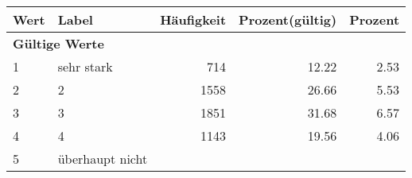      \begin{longtable}{lXrrr}
     \toprule
     \textbf{Wert} & \textbf{Label} & \textbf{Häufigkeit} & \textbf{Prozent(gültig)} & \textbf{Prozent} \\
     \endhead
     \midrule
     \multicolumn{5}{l}{\textbf{Gültige Werte}}\\

     1 &
     \multicolumn{1}{X}{ sehr stark   } &


       \num{714} &
       \num[round-mode=places,round-precision=2]{12.22} &
         \num[round-mode=places,round-precision=2]{2.53} \\

     2 &
     \multicolumn{1}{X}{ 2   } &


       \num{1558} &
       \num[round-mode=places,round-precision=2]{26.66} &
         \num[round-mode=places,round-precision=2]{5.53} \\

     3 &
     \multicolumn{1}{X}{ 3   } &


       \num{1851} &
       \num[round-mode=places,round-precision=2]{31.68} &
         \num[round-mode=places,round-precision=2]{6.57} \\

     4 &
     \multicolumn{1}{X}{ 4   } &


       \num{1143} &
       \num[round-mode=places,round-precision=2]{19.56} &
         \num[round-mode=places,round-precision=2]{4.06} \\

     5 &
     \multicolumn{1}{X}{ überhaupt nicht   } &



\end{longtable}
